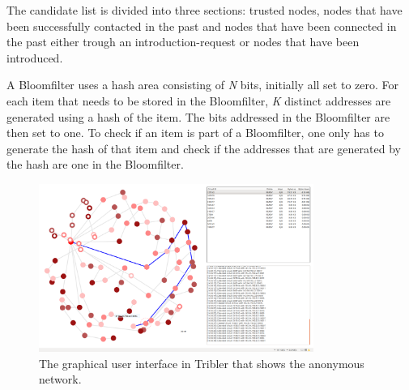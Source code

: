 		The candidate list is divided into three sections: trusted nodes, nodes that have been successfully contacted in the past and nodes that have been connected in the past either trough an introduction-request or nodes that have been introduced.
		
		A Bloomfilter uses a hash area consisting of \emph{N} bits, initially all set to zero. For each item that needs to be stored in the Bloomfilter, \emph{K} distinct addresses are generated using a hash of the item. The bits addressed in the Bloomfilter are then set to one. To check if an item is part of a Bloomfilter, one only has to generate the hash of that item and check if the addresses that are generated by the hash are one in the Bloomfilter.
	
		\begin{figure}[!t]
			\centering
			\includegraphics[width=0.8\textwidth]{prior-work/8hop.png}
			\caption{The graphical user interface in Tribler that shows the anonymous network.}
			\label{fig:anon_downloads}
		\end{figure}